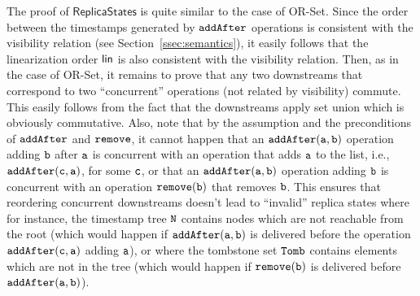 The proof of $\mathsf{ReplicaStates}$ is quite similar to the case of OR-Set. Since the order between the timestamps generated by ${\tt addAfter}$ operations is consistent with the visibility relation (see Section~\ref{ssec:semantics}), it easily follows that the linearization order $\mathsf{lin}$ is also consistent with the visibility relation. Then, as in the case of OR-Set, it remains to prove that any two downstreams that correspond to two ``concurrent'' operations (not related by visibility) commute. This easily follows from the fact that the downstreams apply set union which is obviously commutative. Also, note that by the {} assumption and the preconditions of ${\tt addAfter}$ and ${\tt remove}$, it cannot happen that an $\alabelshort[{\tt addAfter}]{a,b}$ operation adding ${\tt b}$ after ${\tt a}$ is concurrent with an operation that adds ${\tt a}$ to the list, i.e., $\alabelshort[{\tt addAfter}]{c,a}$, for some ${\tt c}$, or that an $\alabelshort[{\tt addAfter}]{a,b}$ operation adding ${\tt b}$ is concurrent with an operation $\alabelshort[{\tt remove}]{b}$ that removes ${\tt b}$. This ensures that reordering concurrent downstreams doesn't lead to ``invalid'' replica states where for instance, the timestamp tree ${\tt N}$ contains nodes which are not reachable from the root (which would happen if $\alabelshort[{\tt addAfter}]{a,b}$ is delivered before the operation $\alabelshort[{\tt addAfter}]{c,a}$ adding ${\tt a}$), or where the tombstone set ${\tt Tomb}$ contains elements which are not in the tree (which would happen if $\alabelshort[{\tt remove}]{b}$ is delivered before $\alabelshort[{\tt addAfter}]{a,b}$).

